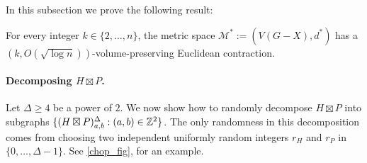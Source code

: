 \documentclass{patmorin}
\renewcommand{\ge}{\geqslant}
\begin{document}

In this subsection we prove the following result:


\begin{clm}\label{dstar_contraction}
For every integer $k\in\{2,\ldots,n\}$, the metric space $\mathcal{M}^*:=(V(G-X),d^*)$ has a \linebreak $(k,O(\sqrt{\log n}))$-volume-preserving Euclidean contraction.
\end{clm}

\paragraph{\boldmath Decomposing $H\boxtimes P$.}

Let $\Delta\ge 4$ be a power of $2$. We now show how to randomly decompose $H\boxtimes P$ into subgraphs $\{(H\boxtimes P)^\Delta_{a,b}:(a,b)\in\mathbb{Z}^2\}$. The only randomness in this decomposition comes from choosing two independent uniformly random integers $r_H$ and $r_P$ in $\{0,\ldots,\Delta-1\}$. See \cref{chop_fig}, for an example.
\end{document}
